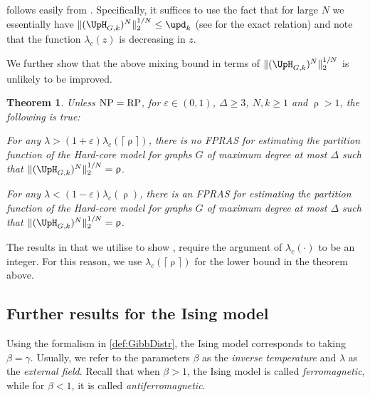 \documentclass[11pt,reqno]{amsart}
\numberwithin{equation}{section}
\newtheorem{theorem}{Theorem}[section]
\newcommand{\bluepigment}[1]{{\color{blue(pigment)}#1}}
\newcommand{\cadmiumgreen}[1]{{\color{cadmiumgreen}#1}}
\newcommand{\goldenbrown}[1]{{\color{goldenbrown}#1}}
\newcommand{\maxDeg}{{\Delta}}
\newcommand{\cconnective}{\goldenbrown{\upd}}
\newcommand{\lcritical}{{\lambda_c}}
\newcommand{\nnorm}[3]{\goldenbrown{\|} #1\goldenbrown{\|}^{#2}_{#3}}
\newcommand{\NBMatrix}{\cadmiumgreen{\UpH}_{G,\kk}}
\renewcommand{\bluepigment}[1]{#1}
\renewcommand{\cadmiumgreen}[1]{#1}
\renewcommand{\goldenbrown}[1]{#1}
\newcommand{\kk}{\bluepigment{k}}
\newcommand{\kz}{\cadmiumgreen{z}}
\renewcommand{\kk}{k}
\renewcommand{\kz}{z}
\newcommand{\SingBound}{\uprho}
\begin{document}
 follows easily from  . Specifically, it suffices to use the fact that 
 for large $N$ we essentially have  $\nnorm{ (\NBMatrix)^N}{1/N}{2}\leq \cconnective_{\kk}$ (see  for
the exact relation) and note that the function $\lcritical(\kz)$ is decreasing in $\kz$.



We further show that the above  mixing bound in terms of  $\nnorm{ (\NBMatrix)^N}{1/N}{2}$ is unlikely to
be improved.  


\begin{theorem}\label{thrm:HarndessTransHCNBM}
Unless ${\rm NP} = {\rm RP}$, for $\varepsilon\in (0,1)$, $\maxDeg\geq 3$, $N,\kk\geq 1$ and $\SingBound > 1$, 
the following is true:


For any $\lambda>(1+\varepsilon)\lcritical(\lceil \SingBound \rceil)$, there is no FPRAS for estimating the partition function 
of the Hard-core model for graphs $G$ of maximum degree at most $\maxDeg$ such that $\nnorm{ (\NBMatrix)^N}{1/N}{2}=\SingBound$.

For any $\lambda<(1-\varepsilon)\lcritical(\SingBound)$, there is an FPRAS for estimating the partition function of the Hard-core model
for graphs $G$ of maximum degree at most $\maxDeg$ such that $\nnorm{ (\NBMatrix)^N}{1/N}{2}=\SingBound$.
\end{theorem}

The results in  \cite{SS14,GSV16Hardness}  that we utilise to show , require the argument 
of $\lcritical(\cdot)$ to be an integer. 
For this reason, we use $\lcritical(\lceil  \SingBound \rceil)$ for the  lower bound in the theorem above. 
%
 






\subsection{Further results for the Ising model}
Using the formalism in \eqref{def:GibbDistr}, the Ising model corresponds to taking $\beta=\gamma$. Usually, we refer to the 
parameters $\beta$ as the {\em inverse temperature} and $\lambda$ as the {\em external field}. 
Recall that  when $\beta>1$, the Ising model is called {\em ferromagnetic}, while for 
$\beta<1$,  it is called {\em antiferromagnetic}.
\end{document}
